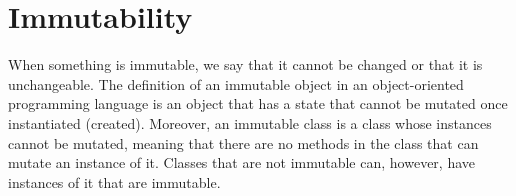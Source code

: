 \documentclass[12pt,twoside]{article}
\begin{document}


\newpage
\section{Immutability}


When something is immutable, we say that it cannot be changed or that it is unchangeable. The definition of an immutable object in an object-oriented programming language is an object that has a state that cannot be mutated once instantiated (created). Moreover, an immutable class is a class whose instances cannot be mutated, meaning that there are no methods in the class that can mutate an instance of it. Classes that are not immutable can, however, have instances of it that are immutable. 
\end{document}
